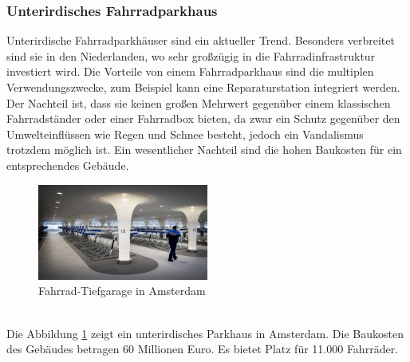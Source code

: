 \subsubsection{Unterirdisches Fahrradparkhaus}
Unterirdische Fahrradparkhäuser sind ein aktueller Trend. Besonders verbreitet sind sie in den Niederlanden, wo sehr großzügig in die Fahrradinfrastruktur investiert wird. Die Vorteile von einem Fahrradparkhaus sind die multiplen Verwendungszwecke, zum Beispiel kann eine Reparaturstation integriert werden.\\
Der Nachteil ist, dass sie keinen großen Mehrwert gegenüber einem klassischen Fahrradständer oder einer Fahrradbox bieten, da zwar ein Schutz gegenüber den Umwelteinflüssen wie Regen und Schnee besteht, jedoch ein Vandalismus trotzdem möglich ist. Ein wesentlicher Nachteil sind die hohen Baukosten für ein entsprechendes Gebäude.\\
\begin{figure}[h]
    \centering
    \includegraphics[width=0.5\textwidth]{images/unterirdischesfahrradparkhaus.jpg}
    \caption{Fahrrad-Tiefgarage in Amsterdam \cite{fahradtiefgarage}}
    \label{fig:fahradtiefgarage}
\end{figure}\\
Die Abbildung \ref*{fig:fahradtiefgarage} zeigt ein unterirdisches Parkhaus in Amsterdam. Die Baukosten des Gebäudes betragen 60 Millionen Euro. Es bietet Platz für 11.000 Fahrräder.
